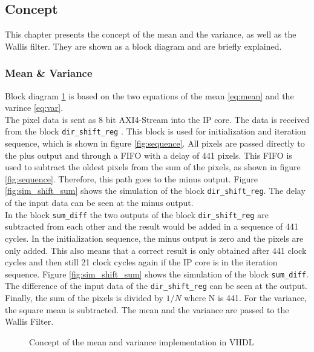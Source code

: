 \subsection{Concept} \label{ch:concept_vhdl}
This chapter presents the concept of the mean and the variance, as well as the Wallis filter. They are shown as a block diagram and are briefly explained.

\subsubsection*{Mean \& Variance}
Block diagram \ref{fig:mean_var_vhdl} is based on the two equations of the mean \ref{eq:mean} and the varince \ref{eq:var}. \\
The pixel data is sent as 8 bit AXI4-Stream into the IP core. The data is
received from the block \texttt{dir\_shift\_reg} . This block is used for
initialization and iteration sequence, which is shown in figure 
\ref{fig:sequence}. All pixels are passed directly to the plus output and
through a FIFO with a delay of 441 pixels. This FIFO is used to subtract the
oldest pixels from the sum of the pixels, as shown in figure \ref{fig:sequence}.
Therefore, this path goes to the minus output. Figure \ref{fig:sim_shift_sum}
shows the simulation of the block \texttt{dir\_shift\_reg}. The delay of the
input data can be seen at the minus output. \\
In the block \texttt{sum\_diff} the two outputs of the block 
\texttt{dir\_shift\_reg} are subtracted from each other and the result would be
added in a sequence of 441 cycles. In the initialization sequence, the minus output is zero and the pixels are only added. This also means that a correct result is only obtained after 441 clock cycles and then still 21 clock cycles again if the IP core is in the iteration sequence. Figure \ref{fig:sim_shift_sum} shows the simulation of the block \texttt{sum\_diff}. The difference of the input data of the \texttt{dir\_shift\_reg} can be seen at the output.\\
Finally, the sum of the pixels is divided by $1/N$ where N is 441. For the variance, the square mean is subtracted. The mean and the variance are passed to the Wallis Filter.

\begin{figure}[tb!]
    \centering
    \begin{adjustbox}{max width=\textwidth, keepaspectratio}
        
    \end{adjustbox}
    \caption{Concept of the mean and variance implementation in VHDL}
    \label{fig:mean_var_vhdl}
\end{figure}

